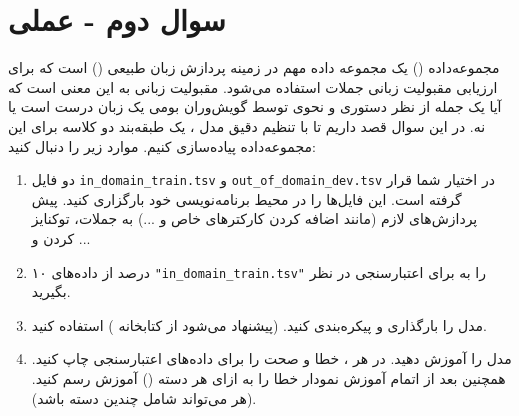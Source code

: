 \section{سوال دوم - عملی}

مجموعه‌داده  () یک مجموعه داده مهم در زمینه پردازش زبان طبیعی () است که برای ارزیابی مقبولیت زبانی جملات استفاده می‌شود. مقبولیت زبانی به این معنی است که آیا یک جمله از نظر دستوری و نحوی توسط گویش‌وران بومی یک زبان درست است یا نه. در این سوال قصد داریم تا با تنظیم دقیق مدل ، یک طبقه‌بند دو کلاسه برای این مجموعه‌داده پیاده‌سازی کنیم. موارد زیر را دنبال کنید:



\begin{enumerate}
	\item 
	دو فایل \texttt{in\_domain\_train.tsv} و \texttt{out\_of\_domain\_dev.tsv} در اختیار شما قرار گرفته است. این فایل‌ها را در محیط برنامه‌نویسی خود بارگزاری کنید. پیش پردازش‌های لازم (مانند اضافه کردن کارکترهای خاص \lr{[SEP]} و ...) به جملات، توکنایز کردن و ...
	
	\begin{qsolve}
		
	\end{qsolve}
	
	
	
	
	\item 
۱۰ درصد از داده‌های \texttt{"in\_domain\_train.tsv"} را به برای اعتبارسنجی در نظر بگیرید.
	\begin{qsolve}
		
	\end{qsolve}
	
	
	
	\item 
مدل  را بارگذاری و پیکره‌بندی کنید. (پیشنهاد می‌شود از کتابخانه ) استفاده کنید.
	\begin{qsolve}
		
	\end{qsolve}





	\item 
مدل را آموزش دهید. در هر ، خطا و صحت را برای داده‌های اعتبارسنجی چاپ کنید. همچنین بعد از اتمام آموزش نمودار خطا را به ازای هر دسته () آموزش رسم کنید. (هر  می‌تواند شامل چندین دسته باشد).
	\begin{qsolve}
		
	\end{qsolve}
	

\end{enumerate}
